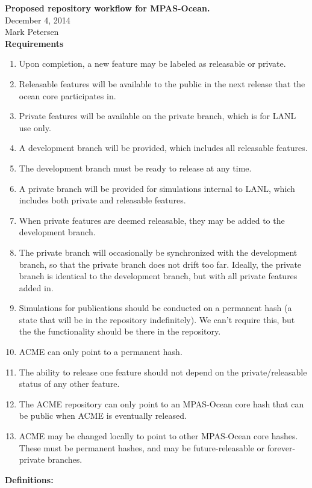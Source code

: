 \documentclass[11pt]{article}
\begin{document}
{\bf Proposed repository workflow for MPAS-Ocean.}\\
December 4, 2014\\
Mark Petersen\\

{\bf Requirements}
\begin{enumerate}
\item Upon completion, a new feature may be labeled as releasable or private.
\item Releasable features will be available to the public in the next release that the ocean core participates in.
\item Private features will be available on the private branch, which is for LANL use only.
\item A development branch will be provided, which includes all releasable features.  
\item The development branch must be ready to release at any time.
\item A private branch will be provided for simulations internal to LANL, which includes both private and releasable features.
\item When private features are deemed releasable, they may be added to the development branch.
\item The private branch will occasionally be synchronized with the development branch, so that the private branch does not drift too far.  Ideally, the private branch is identical to the development branch, but with all private features added in.
\item Simulations for publications should be conducted on a permanent hash (a state that will be in the repository indefinitely).  We can't require this, but the the functionality should be there in the repository.
\item ACME can only point to a permanent hash.
\item The ability to release one feature should not depend on the private/releasable status of any other feature.
\item The ACME repository can only point to an MPAS-Ocean core hash that can be public when ACME is eventually released.
\item ACME may be changed locally to point to other MPAS-Ocean core hashes.  These must be permanent hashes, and may be future-releasable or forever-private branches.
\end{enumerate}

\clearpage

{\bf Definitions:}\\
\end{document}
